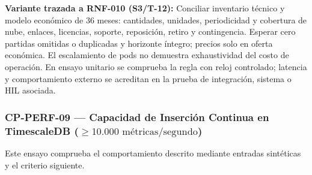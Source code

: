 \par\noindent\textbf{Variante trazada a RNF-010 (S3/T-12):} Conciliar inventario técnico y modelo económico de 36 meses: cantidades, unidades, periodicidad y cobertura de nube, enlaces, licencias, soporte, reposición, retiro y contingencia. Esperar cero partidas omitidas o duplicadas y horizonte íntegro; precios solo en oferta económica. El escalamiento de pods no demuestra exhaustividad del costo de operación. En ensayo unitario se comprueba la regla con reloj controlado; latencia y comportamiento externo se acreditan en la prueba de integración, sistema o HIL asociada.\par
\subsubsection*{CP-PERF-09 — Capacidad de Inserción Continua en TimescaleDB (\(\ge 10.000\text{ métricas/segundo}\))}\label{sec:9-cp-perf-09}
Este ensayo comprueba el comportamiento descrito mediante entradas sintéticas y el criterio siguiente.

